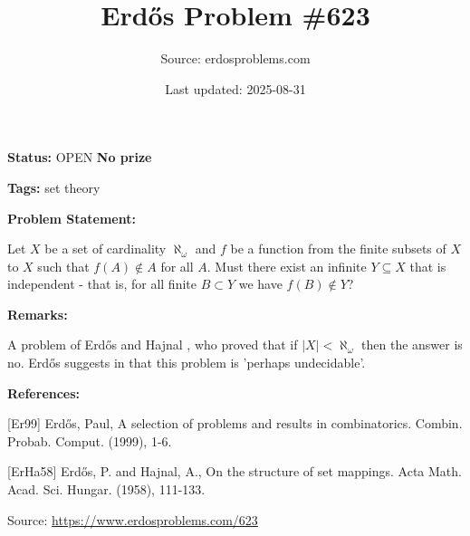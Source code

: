 \documentclass{article}
\title{Erd\H{o}s Problem \#623}
\date{Last updated: 2025-08-31}
\author{Source: erdosproblems.com}
\begin{document}
\maketitle

\noindent\textbf{Status:} OPEN \quad \textbf{No prize}

\noindent\textbf{Tags:} set theory

\medskip
\noindent\textbf{Problem Statement:}

Let $X$ be a set of cardinality $\aleph_\omega$ and $f$ be a function from the finite subsets of $X$ to $X$ such that $f(A)\not\in A$ for all $A$. Must there exist an infinite $Y\subseteq X$ that is independent - that is, for all finite $B\subset Y$ we have $f(B)\not\in Y$?

\bigskip
\noindent\textbf{Remarks:}

A problem of Erd\H{o}s and Hajnal \cite{ErHa58}, who proved that if $\lvert X\rvert <\aleph_\omega$ then the answer is no. Erd\H{o}s suggests in \cite{Er99} that this problem is 'perhaps undecidable'.

\bigskip
\noindent\textbf{References:}

[Er99] Erd\H{o}s, Paul, A selection of problems and results in combinatorics. Combin. Probab. Comput. (1999), 1-6.
 
 [ErHa58] Erd\H{o}s, P. and Hajnal, A., On the structure of set mappings. Acta Math. Acad. Sci. Hungar. (1958), 111-133.

\bigskip
\noindent\small{Source: \url{https://www.erdosproblems.com/623}}
\end{document}
